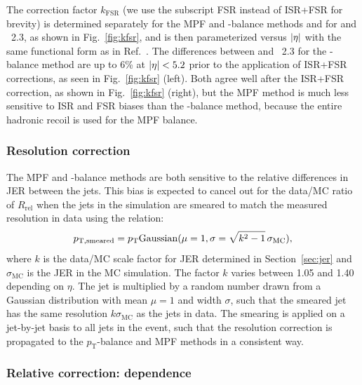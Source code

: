 \documentclass[11pt,twoside,a4paper,cmspaper,final,collab]{cms-tdr}
\begin{document}
The correction factor $k_\mathrm{FSR}$ (we use the subscript FSR instead of ISR+FSR for brevity) is determined separately for the MPF and \pt-balance methods and for  and \HERWIGpp~2.3, as shown in Fig.~\ref{fig:kfsr}, and is then parameterized versus $\lvert \eta \rvert$ with the same functional form as in Ref.~\cite{JEC_JINST}.
The differences between  and \HERWIGpp~2.3 for the \pt-balance method are up to 6\% at $\lvert \eta \rvert<5.2$ prior to the application of ISR+FSR corrections, as seen in Fig.~\ref{fig:kfsr} (left). Both agree well after the ISR+FSR correction, as shown in Fig.~\ref{fig:kfsr} (right), but
the MPF method is much less sensitive to ISR and FSR biases than the \pt-balance method, because the entire hadronic recoil is used for the MPF balance.

\subsubsection*{Resolution correction}\label{sec:l2jer}

The MPF and \pt-balance methods are both sensitive to the relative differences in JER between the jets. This bias is expected to cancel out for the data/MC ratio of $R_\mathrm{ rel}$ when the jets in the simulation are smeared to match the measured resolution in data using the relation:
\begin{equation}\label{eq:l2jer}
p_{\mathrm{T},\rm smeared} = p_{\mathrm{T}} \mathrm{Gaussian}(\mu=1, \sigma=\sqrt{k^2- 1}\,\sigma_\mathrm{MC}),
\end{equation}
where $k$ is the data/MC scale factor for JER determined in Section~\ref{sec:jer} and $\sigma_\mathrm{MC}$ is the JER in the MC simulation. The factor $k$ varies between 1.05 and 1.40 depending on $\eta$.
The jet \pt is multiplied by a random number drawn from a Gaussian distribution with mean $\mu=1$ and width $\sigma$, such that the smeared jet has the same resolution $k\sigma_\mathrm{MC}$ as the jets in data.  The smearing is applied on a jet-by-jet basis to all jets in the event, such that the resolution correction is propagated to the $p_\mathrm{T}$-balance and MPF methods in a consistent way.

\subsubsection*{Relative correction: \pt dependence}\label{sec:l2pt}
\end{document}
